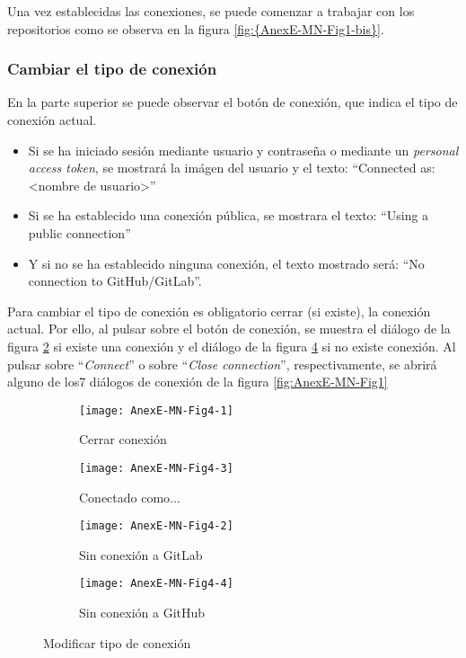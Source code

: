 
Una vez establecidas las conexiones, se puede comenzar a trabajar con los repositorios como se observa en la figura \ref{fig:{AnexE-MN-Fig1-bis}}.

\subsubsection{Cambiar el tipo de conexión}

En la parte superior se puede observar el botón de conexión, que indica el tipo de conexión actual.
\begin{itemize}
	\tightlist
	\item Si se ha iniciado sesión mediante usuario y contraseña o mediante un \textit{personal access token}, se mostrará la imágen del usuario y el texto: ``Connected as: <nombre de usuario>''
	\item Si se ha establecido una conexión pública, se mostrara el texto: ``Using a public connection''
	\item Y si no se ha establecido ninguna conexión, el texto mostrado será: ``No connection to GitHub/GitLab''.
\end{itemize}
Para cambiar el tipo de conexión es obligatorio cerrar (si existe), la conexión actual. Por ello, al pulsar sobre el botón de conexión, se muestra el diálogo de la figura \ref{fig:AnexE-MN-Fig4-1} si existe una conexión y el diálogo de la figura \ref{fig:AnexE-MN-Fig4-2} si no existe conexión. Al pulsar sobre ``\textit{Connect}'' o sobre ``\textit{Close connection}'', respectivamente, se abrirá alguno de los7 diálogos de conexión de la figura \ref{fig:AnexE-MN-Fig1}
\begin{figure}[!h]
	\centering
	\begin{subfigure}{.45\textwidth}
		\centering
		\texttt{[image: AnexE-MN-Fig4-1]}
		\caption{Cerrar conexión}
		\label{fig:AnexE-MN-Fig4-1}
	\end{subfigure}\hfill
	\begin{subfigure}{.45\textwidth}
		\centering
		\texttt{[image: AnexE-MN-Fig4-3]}
		\caption{Conectado como...}
		\label{fig:AnexE-MN-Fig4-1}
	\end{subfigure}\hfill
	\begin{subfigure}{.45\textwidth}
		\centering
		\texttt{[image: AnexE-MN-Fig4-2]}
		\caption{Sin conexión a GitLab}
		\label{fig:AnexE-MN-Fig4-2}
	\end{subfigure}\hfill
	\begin{subfigure}{.45\textwidth}
		\centering
		\texttt{[image: AnexE-MN-Fig4-4]}
		\caption{Sin conexión a GitHub}
		\label{fig:AnexE-MN-Fig4-2}
	\end{subfigure}\hfill
	\caption{Modificar tipo de conexión}
	\label{fig:AnexE-MN-Fig4}
\end{figure}

